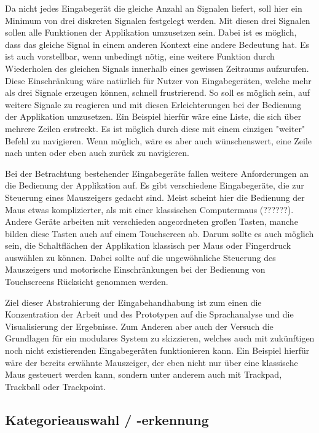         Da nicht jedes Eingabegerät die gleiche Anzahl an Signalen liefert, soll hier ein Minimum von drei diskreten Signalen festgelegt werden. Mit diesen drei Signalen sollen alle Funktionen der Applikation umzusetzen sein. Dabei ist es möglich, dass das gleiche Signal in einem anderen Kontext eine andere Bedeutung hat. Es ist auch vorstellbar, wenn unbedingt nötig, eine weitere Funktion durch Wiederholen des gleichen Signals innerhalb eines gewissen Zeitraums aufzurufen. Diese Einschränkung wäre natürlich für Nutzer von Eingabegeräten, welche mehr als drei Signale erzeugen können, schnell frustrierend. So soll es möglich sein, auf weitere Signale zu reagieren und mit diesen Erleichterungen bei der Bedienung der Applikation umzusetzen. Ein Beispiel hierfür wäre eine Liste, die sich über mehrere Zeilen erstreckt. Es ist möglich durch diese mit einem einzigen "weiter" Befehl zu navigieren. Wenn möglich, wäre es aber auch wünschenswert, eine Zeile nach unten oder eben auch zurück zu navigieren.
        
        Bei der Betrachtung bestehender Eingabegeräte fallen weitere Anforderungen an die Bedienung der Applikation auf. Es gibt verschiedene Eingabegeräte, die zur Steuerung eines Mauszeigers gedacht sind. Meist scheint hier die Bedienung der Maus etwas komplizierter, als mit einer klassischen Computermaus (??????). Andere Geräte arbeiten mit verschieden angeordneten großen Tasten, manche bilden diese Tasten auch auf einem Touchscreen ab. Darum sollte es auch möglich sein, die Schaltflächen der Applikation klassisch per Maus oder Fingerdruck auswählen zu können. Dabei sollte auf die ungewöhnliche Steuerung des Mauszeigers und motorische Einschränkungen bei der Bedienung von Touchscreens Rücksicht genommen werden.
        
        Ziel dieser Abstrahierung der Eingabehandhabung ist zum einen die Konzentration der Arbeit und des Prototypen auf die Sprachanalyse und die Visualisierung der Ergebnisse. Zum Anderen aber auch der Versuch die Grundlagen für ein modulares System zu skizzieren, welches auch mit zukünftigen noch nicht existierenden Eingabegeräten funktionieren kann. Ein Beispiel hierfür wäre der bereits erwähnte Mauszeiger, der eben nicht nur über eine klassische Maus gesteuert werden kann, sondern unter anderem auch mit Trackpad, Trackball oder Trackpoint.
        
    \newpage   
	\subsection{Kategorieauswahl / -erkennung}
    
